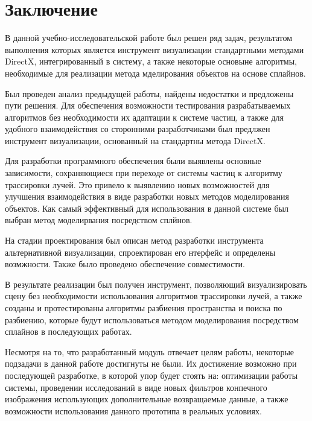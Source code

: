\chapter*{Заключение}

В данной учебно-исследовательской работе был решен ряд задач, результатом выполнения
которых является инструмент визуализации стандартными методами DirectX, интегрированный в систему, а также некоторые основыне алгоритмы, необходимые для реализации метода мделирования объектов на основе сплайнов.

Был проведен анализ предыдущей работы, найдены недостатки и предложены пути решения. Для обеспечения возможности тестирования разрабатываемых алгоритмов без необходимости их адаптации к системе частиц, а также для удобного взаимодействия со сторонними разработчиками был предлжен инструмент визуализации, основанный на стандартны метода DirectX.

Для разработки программного обеспечения были выявлены основные зависимости, сохраняющиеся при переходе от системы частиц к алгоритму трассировки лучей. Это привело к выявлению новых возможностей для улучшения взаимодействия в виде разработки новых методов моделирования объектов. Как самый эффективный для использования в данной системе был выбран метод моделирвания посредством сплйнов.

На стадии проектирования был описан метод разработки инструмента альтернативной визуализации, спроектирован его нтерфейс и определены возмжности. Также было проведено обеспечение совместимости.

В результате реализации был получен инструмент, позволяющий визуализировать сцену без необходимости использования алгоритмов трассировки лучей, а также созданы и протестированы алгоритмы разбиения пространства и поиска по разбиению, которые будут использоваться методом моделирования посредством сплайнов в последующих работах.

Несмотря на то, что разработанный модуль отвечает целям работы, некоторые подзадачи в данной работе достигнуты не были. Их достижение возможно при последующей разработке, в которой упор будет стоять на: оптимизации работы системы, проведении исследований в виде новых фильтров конпечного изображения использующих дополнительные возвращаемые данные, а также возможности использования данного прототипа в реальных условиях.